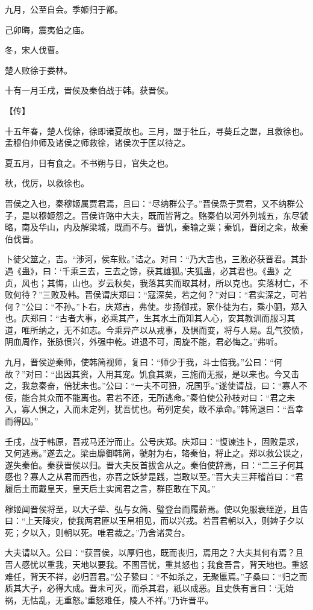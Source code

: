 \documentclass[a4paper,12pt,UTF8,twoside]{ctexbook}
\begin{document}
九月，公至自会。季姬归于鄫。

己卯晦，震夷伯之庙。

冬，宋人伐曹。

楚人败徐于娄林。

十有一月壬戌，晋侯及秦伯战于韩。获晋侯。

【传】

十五年春，楚人伐徐，徐即诸夏故也。三月，盟于牡丘，寻葵丘之盟，且救徐也。孟穆伯帅师及诸侯之师救徐，诸侯次于匡以待之。

夏五月，日有食之。不书朔与日，官失之也。

秋，伐厉，以救徐也。

晋侯之入也，秦穆姬属贾君焉，且曰：“尽纳群公子。”晋侯烝于贾君，又不纳群公子，是以穆姬怨之。晋侯许赂中大夫，既而皆背之。赂秦伯以河外列城五，东尽虢略，南及华山，内及解梁城，既而不与。晋饥，秦输之粟；秦饥，晋闭之籴，故秦伯伐晋。

卜徒父筮之，吉。“涉河，侯车败。”诘之。对曰：“乃大吉也，三败必获晋君。其卦遇《蛊》，曰：‘千乘三去，三去之馀，获其雄狐。’夫狐蛊，必其君也。《蛊》之贞，风也；其悔，山也。岁云秋矣，我落其实而取其材，所以克也。实落材亡，不败何待？”三败及韩。晋侯谓庆郑曰：“寇深矣，若之何？”对曰：“君实深之，可若何？”公曰：“不孙。”卜右，庆郑吉，弗使。步扬御戎，家仆徒为右，乘小驷，郑入也。庆郑曰：“古者大事，必乘其产，生其水土而知其人心，安其教训而服习其道，唯所纳之，无不如志。今乘异产以从戎事，及惧而变，将与人易。乱气狡愤，阴血周作，张脉偾兴，外强中乾。进退不可，周旋不能，君必悔之。”弗听。

九月，晋侯逆秦师，使韩简视师，复曰：“师少于我，斗士倍我。”公曰：“何故？”对曰：“出因其资，入用其宠。饥食其粟，三施而无报，是以来也。今又击之，我怠秦奋，倍犹未也。”公曰：“一夫不可狃，况国乎。”遂使请战，曰：“寡人不佞，能合其众而不能离也。君若不还，无所逃命。”秦伯使公孙枝对曰：“君之未入，寡人惧之，入而未定列，犹吾忧也。苟列定矣，敢不承命。”韩简退曰：“吾幸而得囚。”

壬戌，战于韩原，晋戎马还泞而止。公号庆郑。庆郑曰：“愎谏违卜，固败是求，又何逃焉。”遂去之。梁由靡御韩简，虢射为右，辂秦伯，将止之。郑以救公误之，遂失秦伯。秦获晋侯以归。晋大夫反首拔舍从之。秦伯使辞焉，曰：“二三子何其慼也？寡人之从君而西也，亦晋之妖梦是践，岂敢以至。”晋大夫三拜稽首曰：“君履后土而戴皇天，皇天后土实闻君之言，群臣敢在下风。”

穆姬闻晋侯将至，以大子荦、弘与女简、璧登台而履薪焉。使以免服衰绖逆，且告曰：“上天降灾，使我两君匪以玉帛相见，而以兴戎。若晋君朝以入，则婢子夕以死；夕以入，则朝以死。唯君裁之。”乃舍诸灵台。

大夫请以入。公曰：“获晋侯，以厚归也，既而丧归，焉用之？大夫其何有焉？且晋人慼忧以重我，天地以要我。不图晋忧，重其怒也；我食吾言，背天地也。重怒难任，背天不祥，必归晋君。”公子絷曰：“不如杀之，无聚慝焉。”子桑曰：“归之而质其大子，必得大成。晋未可灭，而杀其君，祇以成恶。且史佚有言曰：‘无始祸，无怙乱，无重怒。’重怒难任，陵人不祥。”乃许晋平。
\end{document}
